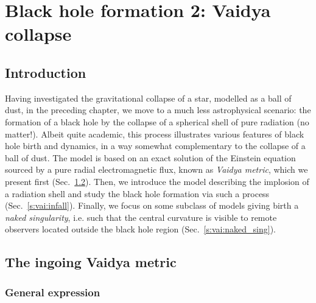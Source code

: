 \chapter{Black hole formation 2: Vaidya collapse}
\label{s:vai}

\minitoc

\section{Introduction}

Having investigated the gravitational collapse of a star, modelled as a ball of dust,
in the preceding chapter, we move to a much less astrophysical scenario: the
formation of a black hole by the collapse of a spherical shell of pure radiation
(no matter!).
Albeit quite academic, this process illustrates various features of black hole birth and dynamics,
in a way somewhat complementary to the collapse of a ball of dust.
The model is based on an exact solution of the Einstein equation sourced by
a pure radial electromagnetic flux, known as \emph{Vaidya metric}, which
we present first (Sec.~\ref{s:vai:Vaidya_metric}).
Then, we introduce the
model describing the implosion of a radiation shell and
study the black hole formation via such a process (Sec.~\ref{s:vai:infall}).
Finally, we focus on
some subclass of models giving birth a \emph{naked singularity}, i.e.
such that the central curvature is visible to remote observers located
outside the black hole region (Sec.~\ref{s:vai:naked_sing}).


\section{The ingoing Vaidya metric} \label{s:vai:Vaidya_metric}

\subsection{General expression} \label{s:vai:general}

